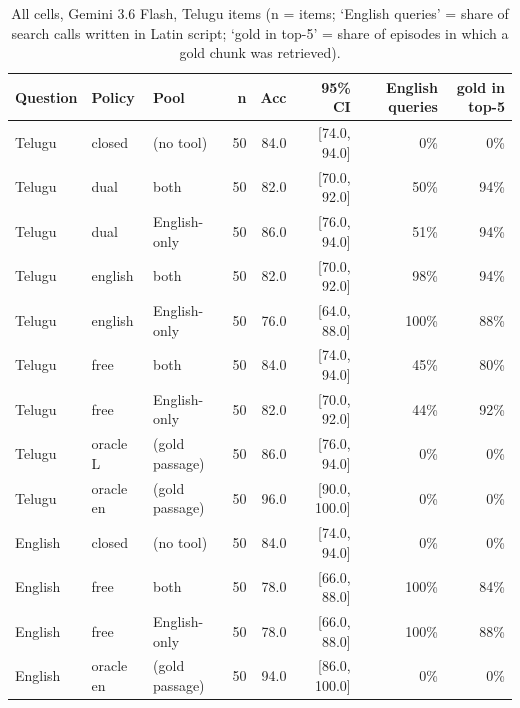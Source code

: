 \begin{table}[h]\centering\scriptsize
\begin{tabular}{lllrrrrr}
\toprule
Question & Policy & Pool & n & Acc & 95\% CI & English queries & gold in top-5 \\
\midrule
Telugu & closed & (no tool) & 50 & 84.0 & [74.0, 94.0] & 0\% & 0\% \\
Telugu & dual & both & 50 & 82.0 & [70.0, 92.0] & 50\% & 94\% \\
Telugu & dual & English-only & 50 & 86.0 & [76.0, 94.0] & 51\% & 94\% \\
Telugu & english & both & 50 & 82.0 & [70.0, 92.0] & 98\% & 94\% \\
Telugu & english & English-only & 50 & 76.0 & [64.0, 88.0] & 100\% & 88\% \\
Telugu & free & both & 50 & 84.0 & [74.0, 94.0] & 45\% & 80\% \\
Telugu & free & English-only & 50 & 82.0 & [70.0, 92.0] & 44\% & 92\% \\
Telugu & oracle L & (gold passage) & 50 & 86.0 & [76.0, 94.0] & 0\% & 0\% \\
Telugu & oracle en & (gold passage) & 50 & 96.0 & [90.0, 100.0] & 0\% & 0\% \\
English & closed & (no tool) & 50 & 84.0 & [74.0, 94.0] & 0\% & 0\% \\
English & free & both & 50 & 78.0 & [66.0, 88.0] & 100\% & 84\% \\
English & free & English-only & 50 & 78.0 & [66.0, 88.0] & 100\% & 88\% \\
English & oracle en & (gold passage) & 50 & 94.0 & [86.0, 100.0] & 0\% & 0\% \\
\bottomrule
\end{tabular}
\caption{All cells, Gemini 3.6 Flash, Telugu items (n = items; `English queries' = share of search calls written in Latin script; `gold in top-5' = share of episodes in which a gold chunk was retrieved).}
\end{table}

